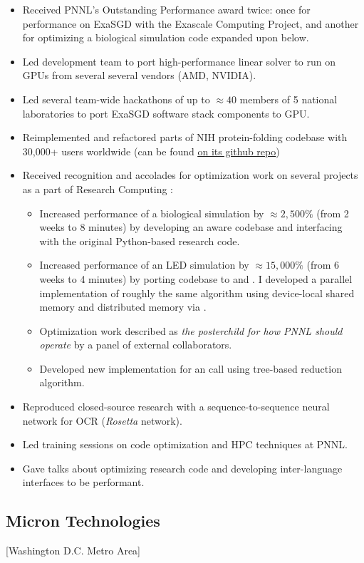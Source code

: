 \documentclass{mycv}
\begin{document}
\begin{itemize}
  \item Received PNNL's Outstanding Performance award twice: once for performance on ExaSGD with the Exascale Computing Project, and another for optimizing a biological simulation code expanded upon below.
  \item Led development team to port high-performance linear solver \hiop to run on GPUs from several several vendors (AMD, NVIDIA).
  \item Led several team-wide hackathons of up to $\approx 40$ members of 5 national laboratories to port ExaSGD software stack components to GPU.
  \item Reimplemented and refactored parts of NIH protein-folding codebase with 30,000+ users worldwide (can be found \href{https://github.com/Electrostatics/apbs}{\underline{on its github repo}})
  \item Received recognition and accolades for optimization work on several projects as a part of Research Computing :
  \begin{itemize}
    \item Increased performance of a biological simulation by $\approx 2,500\%$ (from 2 weeks to 8 minutes) by developing an \mpi aware \cpp codebase and interfacing with the original Python-based research code.
    \item Increased performance of an LED simulation by $\approx 15,000\%$ (from 6 weeks to 4 minutes) by porting \matlab codebase to \cee and \cpp. I developed a parallel implementation of roughly the same algorithm using device-local shared memory and distributed memory via \mpi.
    \item Optimization work described as \textit{the posterchild for how PNNL should operate} by a panel of external collaborators.
    \item Developed new implementation for an \mpigv call using tree-based reduction algorithm.
  \end{itemize}
  \item Reproduced closed-source research with a sequence-to-sequence neural network for OCR (\textit{Rosetta} network).
  \item Led training sessions on code optimization and HPC techniques at PNNL.
  \item Gave talks about optimizing research code and developing inter-language interfaces to be performant.
\end{itemize}

\subsection{Micron Technologies}[Washington D.C. Metro Area]
\begin{positions}
\end{positions}
\end{document}
